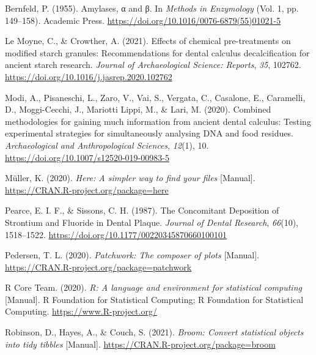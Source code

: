 \documentclass[
  letterpaper,
]{book}
\newlength{\cslhangindent}
\newlength{\cslentryspacingunit} %
\newenvironment{CSLReferences}[2] %
 {%
  \setlength{\parindent}{0pt}
  \ifodd #1
  \let\oldpar\par
  \def\par{\hangindent=\cslhangindent\oldpar}
  \fi
  \setlength{\parskip}{#2\cslentryspacingunit}
 }%
 {}
\begin{document}
\hypertarget{refs-7}{}
\begin{CSLReferences}{1}{0}
\leavevmode{}%
Bernfeld, P. (1955). Amylases, α and β. In \emph{Methods in
{Enzymology}} (Vol. 1, pp. 149--158). {Academic Press}.
\url{https://doi.org/10.1016/0076-6879(55)01021-5}

\leavevmode{}%
Le Moyne, C., \& Crowther, A. (2021). Effects of chemical pre-treatments
on modified starch granules: {Recommendations} for dental calculus
decalcification for ancient starch research. \emph{Journal of
Archaeological Science: Reports}, \emph{35}, 102762.
\url{https://doi.org/10.1016/j.jasrep.2020.102762}

\leavevmode{}%
Modi, A., Pisaneschi, L., Zaro, V., Vai, S., Vergata, C., Casalone, E.,
Caramelli, D., Moggi-Cecchi, J., Mariotti Lippi, M., \& Lari, M. (2020).
Combined methodologies for gaining much information from ancient dental
calculus: Testing experimental strategies for simultaneously analysing
{DNA} and food residues. \emph{Archaeological and Anthropological
Sciences}, \emph{12}(1), 10.
\url{https://doi.org/10.1007/s12520-019-00983-5}

\leavevmode{}%
Müller, K. (2020). \emph{Here: {A} simpler way to find your files}
{[}Manual{]}. \url{https://CRAN.R-project.org/package=here}

\leavevmode{}%
Pearce, E. I. F., \& Sissons, C. H. (1987). The {Concomitant Deposition}
of {Strontium} and {Fluoride} in {Dental Plaque}. \emph{Journal of
Dental Research}, \emph{66}(10), 1518--1522.
\url{https://doi.org/10.1177/00220345870660100101}

\leavevmode{}%
Pedersen, T. L. (2020). \emph{Patchwork: {The} composer of plots}
{[}Manual{]}. \url{https://CRAN.R-project.org/package=patchwork}

\leavevmode{}%
R Core Team. (2020). \emph{R: {A} language and environment for
statistical computing} {[}Manual{]}. {R Foundation for Statistical
Computing}; {R Foundation for Statistical Computing}.
\url{https://www.R-project.org/}

\leavevmode{}%
Robinson, D., Hayes, A., \& Couch, S. (2021). \emph{Broom: {Convert}
statistical objects into tidy tibbles} {[}Manual{]}.
\url{https://CRAN.R-project.org/package=broom}


\end{CSLReferences}
\end{document}
